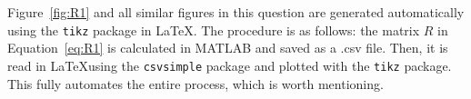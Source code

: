 \documentclass[12pt,onecolumn,a4paper]{article}
\begin{document}
	
	\begin{note}
		Figure~\ref{fig:R1} and all similar figures in this question are generated automatically using the \texttt{tikz} package in \LaTeX. The procedure is as follows: the matrix $R$ in Equation~\eqref{eq:R1} is calculated in MATLAB and saved as a .csv file. Then, it is read in \LaTeX using the \texttt{csvsimple} package and plotted with the \texttt{tikz} package. This fully automates the entire process, which is worth mentioning.
	\end{note}
	
	

	
	\newpage
	
	
	
\end{document}
